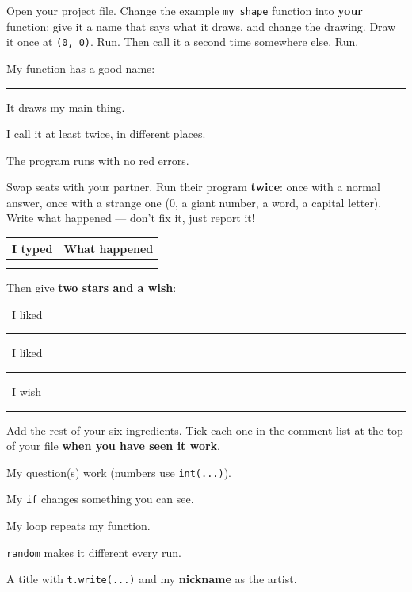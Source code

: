 \begin{exercise}
Open your project file. Change the example \texttt{my\_shape} function into \textbf{your} function: give it a name that says what it draws, and change the drawing. Draw it once at \texttt{(0, 0)}. Run. Then call it a second time somewhere else. Run.
\begin{checklist}
  \item My function has a good name: \rule{5cm}{0.4pt}
  \item It draws my main thing.
  \item I call it at least twice, in different places.
  \item The program runs with no red errors.
\end{checklist}
\end{exercise}

\begin{exercise}
Swap seats with your partner. Run their program \textbf{twice}: once with a normal answer, once with a strange one (0, a giant number, a word, a capital letter). Write what happened --- don't fix it, just report it!
\begin{center}
\renewcommand{\arraystretch}{1.6}
\begin{tabular}{@{}p{4cm}p{9.4cm}@{}}
\toprule
I typed & What happened\\
\midrule
 & \\ \midrule
 & \\
\bottomrule
\end{tabular}
\end{center}
Then give \textbf{two stars and a wish}:\par
\faStar\ I liked \rule{11.5cm}{0.4pt}\par\smallskip
\faStar\ I liked \rule{11.5cm}{0.4pt}\par\smallskip
\faMagic\ I wish \rule{11.5cm}{0.4pt}
\end{exercise}

\begin{exercise}
Add the rest of your six ingredients. Tick each one in the comment list at the top of your file \textbf{when you have seen it work}.
\begin{checklist}
  \item My question(s) work (numbers use \texttt{int(...)}).
  \item My \texttt{if} changes something you can see.
  \item My loop repeats my function.
  \item \texttt{random} makes it different every run.
  \item A title with \texttt{t.write(...)} and my \textbf{nickname} as the artist.
\end{checklist}
\end{exercise}

